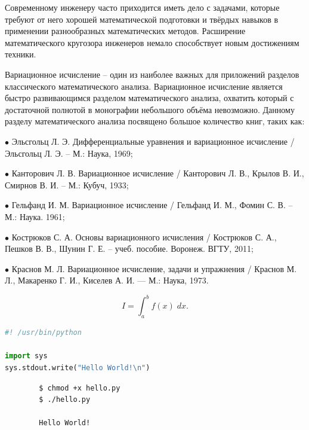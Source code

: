 \documentclass{article}
\begin{document}
Современному инженеру часто приходится иметь дело с задачами, которые требуют от него хорошей математической подготовки и твёрдых навыков в применении разнообразных математических методов. Расширение математического кругозора инженеров немало способствует новым достижениям техники.

Вариационное исчисление – один из наиболее важных для приложений разделов классического математического анализа. Вариационное исчисление является быстро развивающимся разделом математического анализа, охватить который с достаточной полнотой в монографии небольшого объёма невозможно. Данному разделу математического анализа посвящено большое количество книг, таких как:

$\bullet$ Эльсгольц Л. Э. Дифференциальные уравнения и вариационное исчисление / Эльсгольц Л. Э. – М.: Наука, 1969;

$\bullet$ Канторович Л. В. Вариационное исчисление / Канторович Л. В., Крылов В. И., Смирнов В. И. – М.: Кубуч, 1933;

$\bullet$ Гельфанд И. М. Вариационное исчисление / Гельфанд И. М., Фомин С. В. – М.: Наука. 1961;

$\bullet$ Кострюков С. А. Основы вариационного исчисления / Кострюков С. А., Пешков В. В., Шунин Г. Е. – учеб. пособие. Воронеж. ВГТУ, 2011;

$\bullet$ Краснов М. Л. Вариационное исчисление, задачи и упражнения / Краснов М. Л., Макаренко Г. И., Киселев А. И.  — М.: Наука, 1973.


\newpage



\begin{equation}
	I = \int_{a}^{b} f(x) \; dx.
\end{equation}

\begin{file}[hello.py]
\begin{lstlisting}[language=Python]
#! /usr/bin/python

import sys
sys.stdout.write("Hello World!\n")
\end{lstlisting}
\end{file}

\begin{commandline}
	\begin{verbatim}
		$ chmod +x hello.py
		$ ./hello.py

		Hello World!
	\end{verbatim}
\end{commandline}
\end{document}
